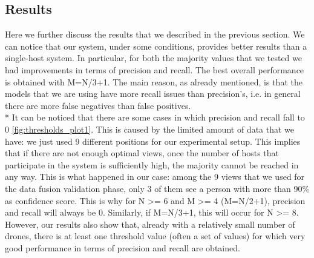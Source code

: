 \documentclass[10pt,conference,compsocconf]{IEEEtran}
\begin{document}
\begin{enumerate}
\section{Results}
\label{sec:results}
Here we further discuss the results that we described in the previous section. We can notice that our system, under some conditions, provides better results than a single-host system. In particular, for both the majority values that we tested we had improvements in terms of precision and recall. The best overall performance is obtained with M=N/3+1. The main reason, as already mentioned, is that the models that we are using have more recall issues than precision's, i.e. in general there are more false negatives than false positives.\\*
It can be noticed that there are some cases in which precision and recall fall to 0 \ref{fig:thresholds_plot1}. This is caused by the limited amount of data that we have: we just used 9 different positions for our experimental setup. This implies that if there are not enough optimal views, once the number of hosts that participate in the system is sufficiently high, the majority cannot be reached in any way. This is what happened in our case: among the 9 views that we used for the data fusion validation phase, only 3 of them see a person with more than 90\% as confidence score. This is why for N \textgreater= 6 and M \textgreater= 4 (M=N/2+1), precision and recall will always be 0. Similarly, if M=N/3+1, this will occur for N \textgreater= 8. However, our results also show that, already with a relatively small number of drones, there is at least one threshold value (often a set of values) for which very good performance in terms of precision and recall are obtained.

\end{enumerate}
\end{document}
